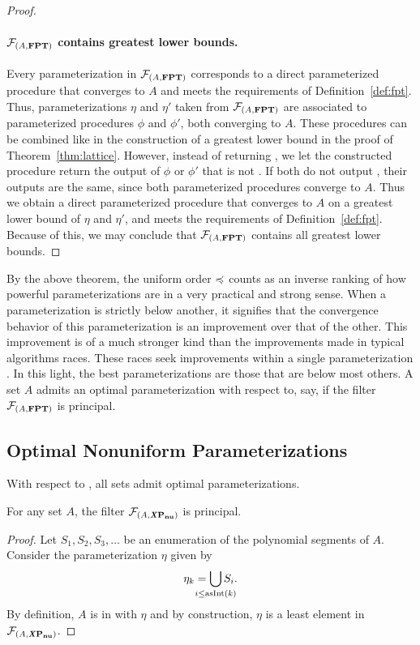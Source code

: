 \begin{proof}
  \paragraph{$\mathcal{F}_{(A, \textnormal{\textbf{FPT}})}$ contains greatest lower bounds.}
  Every parameterization in $\mathcal{F}_{(A, \textnormal{\textbf{FPT}})}$ corresponds to a direct parameterized procedure that converges to $A$ and meets the requirements of Definition~\ref{def:fpt}.
  Thus, parameterizations $\eta$ and $\eta'$ taken from $\mathcal{F}_{(A, \textnormal{\textbf{FPT}})}$ are associated to parameterized procedures $\phi$ and $\phi'$, both converging to $A$.
  These procedures can be combined like in the construction of a greatest lower bound in the proof of Theorem~\ref{thm:lattice}.
  However, instead of returning , we let the constructed procedure return the output of $\phi$ or $\phi'$ that is not .
  If both do not output , their outputs are the same, since both parameterized procedures converge to $A$.
  Thus we obtain a direct parameterized procedure that converges to $A$ on a greatest lower bound of $\eta$ and $\eta'$, and meets the requirements of Definition~\ref{def:fpt}.
  Because of this, we may conclude that $\mathcal{F}_{(A, \textnormal{\textbf{FPT}})}$ contains all greatest lower bounds.
\end{proof}

By the above theorem, the uniform order $\preccurlyeq$ counts as an inverse ranking of how powerful parameterizations are in a very practical and strong sense.
When a parameterization is strictly below another, it signifies that the convergence behavior of this parameterization is an improvement over that of the other.
This improvement is of a much stronger kind than the improvements made in typical algorithms races.
These races seek improvements within a single parameterization \parencite{komusiewicz2012new,fellows2013towards}.
In this light, the best parameterizations are those that are below most others.
A set $A$ admits an optimal parameterization with respect to, say,  if the filter $\mathcal{F}_{(A, \textnormal{\textbf{FPT}})}$ is principal.

\subsection{Optimal Nonuniform Parameterizations}
With respect to , all sets admit optimal parameterizations.
\begin{theorem}
\label{thm:nuxpprincipal}
  For any set $A$, the filter $\mathcal{F}_{(A, \textnormal{\textbf{\textit{X}P$_\textbf{nu}$}})}$ is principal.
\end{theorem}
\begin{proof}
  Let $S_1, S_2, S_3, \ldots$ be an enumeration of the polynomial segments of $A$.
  Consider the parameterization $\eta$ given by
  \begin{equation*}
    \eta_k \deq \bigcup_{\mathclap{i \le \asNat(k)}} S_i.
  \end{equation*}
  By definition, $A$ is in  with $\eta$ and by construction, $\eta$ is a least element in $\mathcal{F}_{(A, \textnormal{\textbf{\textit{X}P$_\textbf{nu}$}})}$.
\end{proof}

